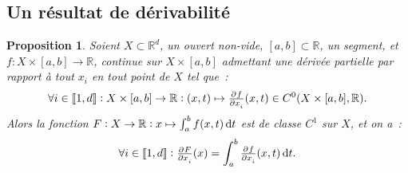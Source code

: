 \documentclass{report}
\newtheorem{prp}[thm]{Proposition}
\theoremstyle{definition}
\theoremstyle{remark}
\numberwithin{equation}{section}
\newcommand{\R}{\mathbb R}
\newcommand{\intint}[2]{\left\llbracket#1, #2\right\rrbracket}
\begin{document}
		\subsection{Un résultat de dérivabilité}
			\begin{prp}\label{prp:dérivabilitésegmentfixe} Soient $X \subset \R^d$, un ouvert non-vide, $[a, b] \subset \R$, un segment, et
			$f : X \times [a, b] \to \R$, continue sur $X \times [a, b]$ admettant une dérivée partielle par rapport à tout $x_i$ en tout point de $X$ tel que~:
			\begin{equation}
				\forall i \in \intint 1d : X \times [a, b] \to \R : (x, t) \mapsto \pd f{x_i}(x, t) \in C^0(X \times [a, b], \R).
			\end{equation}
			Alors la fonction $F : X \to \R : x \mapsto \int_a^b f(x, t)\dif t$ est de classe $C^1$ sur $X$, et on a~:
			\begin{equation}
				\forall i \in \intint 1d : \pd F{x_i}(x) = \int_a^b \pd f{x_i}(x, t)\dif t.
			\end{equation}
			\end{prp}
\end{document}

